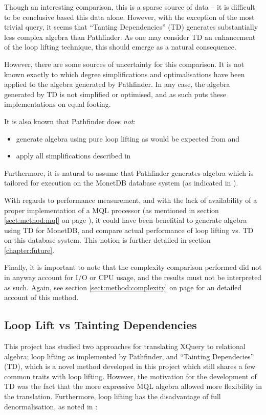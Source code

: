 Though an interesting comparison, this is a sparse source of data -- it
is difficult to be conclusive based this data alone. However, with the
exception of the most trivial query, it seems that ``Tanting Dependencies'' (TD)
generates substantially less complex algebra than Pathfinder. As one
may consider TD an enhancement of the loop lifting technique, this should
emerge as a natural consequence.

However, there are some sources of uncertainty for this comparison. It is not
known exactly to which degree simplifications and optimalisations have been
applied to the algebra generated by Pathfinder. In any case, the
algebra generated by TD is not simplified or optimised, and as such puts these
implementations on equal footing. 

It is also known that Pathfinder does \emph{not}:
\begin{itemize}
  \item generate algebra using pure loop lifting as would be expected from
  \cite{pathfinder_mothertongue} and \cite{pathfinder_purelyRelational}
  \item apply all simplifications described in
  \cite{pathfinder_purelyRelational}
\end{itemize}

Furthermore, it is natural to assume that Pathfinder generates algebra
which is tailored for execution on the MonetDB database system (as indicated
in \cite{pathfinder_purelyRelational}).

With regards to performance measurement, and with the lack of availability of a
proper implementation of a MQL processor (as mentioned in section
\ref{sect:method:mql} on page \pageref{sect:method:mql}), it could have been
benefitial to generate algebra using TD for MonetDB, and compare
actual performance of loop lifting vs. TD on this database system. This notion
is further detailed in section \ref{chapter:future}.

Finally, it is important to note that the complexity comparison performed did
not in anyway account for I/O or CPU usage, and the results must not be
interpreted as such. Again, see section \ref{sect:method:complexity} on
page \pageref{sect:method:complexity} for an detailed account of this method.

\subsection{Loop Lift vs Tainting Dependencies}
\label{sect:disc:llvsTD}
This project has studied two approaches for translating XQuery to relational
algebra; loop lifting as implemented by Pathfinder, and ``Tainting
Dependecies'' (TD), which is a novel method developed in this project which
still shares a few common traits with loop lifting. However, the motivation for
the development of TD was the fact that the more expressive MQL algebra allowed
more flexibility in the translation. Furthermore, loop lifting has the
disadvantage of full denormalisation, as noted in
\cite{pathfinder_purelyRelational}: 

